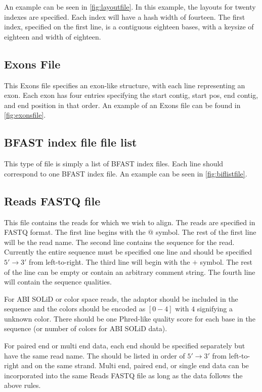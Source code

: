 \documentclass[a4paper,12pt]{book}
\newcommand{\RFF}{Reads FASTQ file}
\newcommand{\BIF}{BFAST index file} %
\newcommand{\FIVETOTHREE}{$5'\rightarrow3'$} %
\begin{document}
An example can be seen in \autoref{fig:layoutfile}.
In this example, the layouts for twenty indexes are specified.
Each index will have a hash width of fourteen.
The first index, specified on the first line, is a contiguous eighteen bases, with a keysize of eighteen and width of eighteen.

\subsection{Exons File}
\label{sec:exonsfile}
This Exons file specifies an exon-like structure, with each line representing an exon.
Each exon has four entries specifying the start contig, start pos, end contig, and end position in that order.
An example of an Exons file can be found in \autoref{fig:exonsfile}. 

\subsection{\BIF{} file list}
\label{sec:biflistfile}
This type of file is simply a list of \BIF{s}.
Each line should correspond to one \BIF{}.
An example can be seen in \autoref{fig:biflistfile}.
\subsection{\RFF{}}
\label{sec:rff}
This file contains the reads for which we wish to align.
The reads are specified in FASTQ format.
The first line begins with the $@$ symbol.
The rest of the first line will be the read name.
The second line contains the sequence for the read.
Currently the entire sequence must be specified one line and should be specified \FIVETOTHREE{} from left-to-right.
The third line will begin with the $+$ symbol.
The rest of the line can be empty or contain an arbitrary comment string.
The fourth line will contain the sequence qualities.

For ABI SOLiD or color space reads, the adaptor should be included in the sequence and the colors should be encoded as $[0-4]$ with $4$ signifying a unknown color.  
There should be one Phred-like quality score for each base in the sequence (or number of colors for ABI SOLiD data).

For paired end or multi end data, each end should be specified separately but have the same read name.
The should be listed in order of \FIVETOTHREE{} from left-to-right and on the same strand.
Multi end, paired end, or single end data can be incorporated into the same \RFF{} as long as the data follows the above rules.
\end{document}

